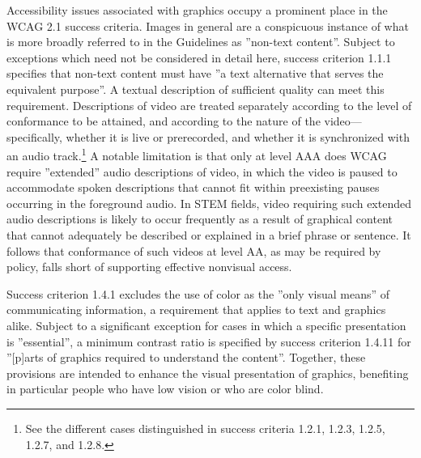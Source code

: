 \documentclass{sig-alternate} %
\begin{document}
\begin{large}
Accessibility issues associated with graphics occupy a prominent place in the WCAG 2.1 success criteria. Images in general are a conspicuous instance of what is more broadly referred to in the Guidelines as ”non-text content”. Subject to exceptions which need not be considered in detail here, success criterion 1.1.1 specifies that non-text content must have ”a text alternative that serves the equivalent purpose”. A textual description of sufficient quality can meet this requirement. Descriptions of video are treated separately according to the level of conformance to be attained, and according to the nature of the video—specifically, whether it is live or prerecorded, and whether it is synchronized with an audio track.\footnote{See the different cases distinguished in success criteria 1.2.1, 1.2.3, 1.2.5, 1.2.7, and 1.2.8.} A notable limitation is that only at level AAA does WCAG require ”extended” audio descriptions of video, in which the video is paused to accommodate spoken descriptions that cannot fit within preexisting pauses occurring in the foreground audio. In STEM fields, video requiring such extended audio descriptions is likely to occur frequently as a result of graphical content that cannot adequately be described or explained in a brief phrase or sentence. It follows that conformance of such videos at level AA, as may be required by policy, falls short of supporting effective nonvisual access.

Success criterion 1.4.1 excludes the use of color as the ”only visual means” of communicating information, a requirement that applies to text and graphics alike. Subject to a significant exception for cases in which a specific presentation is ”essential”, a minimum contrast ratio is specified by success criterion 1.4.11 for ”[p]arts of graphics required to understand the content”. Together, these provisions are intended to enhance the visual presentation of graphics, benefiting in particular people who have low vision or who are color blind.


\end{large}
\end{document}
